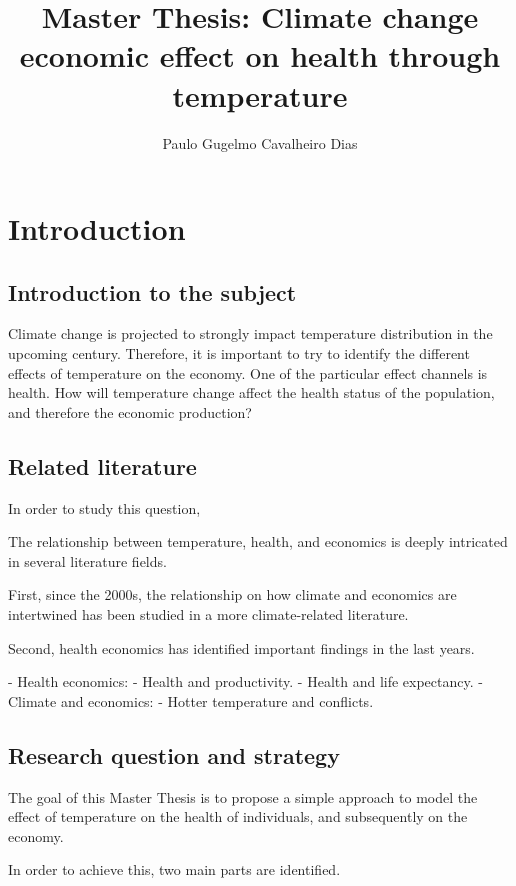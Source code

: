 \documentclass{article}
\author{Paulo Gugelmo Cavalheiro Dias}
\title{Master Thesis: Climate change economic effect on health through temperature}
\begin{document}
\maketitle

\tableofcontents

\section{Introduction}

\subsection{Introduction to the subject}

Climate change is projected to strongly impact temperature distribution in the upcoming century. 
Therefore, it is important to try to identify the different effects of temperature on the economy.
One of the particular effect channels is health. 
How will temperature change affect the health status of the population, and therefore the economic production?

\subsection{Related literature}

In order to study this question, 

The relationship between temperature, health, and economics is deeply intricated 
in several literature fields. 

First, since the 2000s, the relationship on how climate and economics are intertwined has been studied in a more climate-related literature.

Second, health economics has identified important findings in the last years.

- Health economics: 
    - Health and productivity.
    - Health and life expectancy.
- Climate and economics: 
    - Hotter temperature and conflicts. 


\subsection{Research question and strategy}

The goal of this Master Thesis is to propose a simple approach to model the effect
of temperature on the health of individuals, and subsequently on the economy. 

In order to achieve this, two main parts are identified. 
\end{document}
